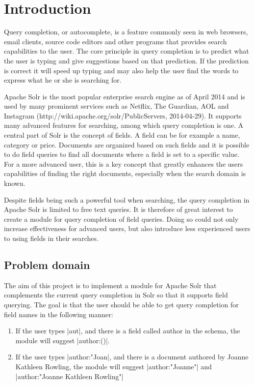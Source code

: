 \section{Introduction}\label{introduction}
Query completion, or autocomplete, is a feature commonly seen in web browsers, email clients, source code editors and other programs that provides search capabilities to the user. The core principle in query completion is to predict what the user is typing and give suggestions based on that prediction. If the prediction is correct it will speed up typing and may also help the user find the words to express what he or she is searching for. 

Apache Solr is the most popular enterprise search engine as of April 2014\cite{ranking} and is used by many prominent services such as Netflix, The Guardian, AOL and Instagram (http://wiki.apache.org/solr/PublicServers, 2014-04-29). It supports many advanced features for searching, among which query completion is one. A central part of Solr is the concept of fields. A field can be for example a name, category or price. Documents are organized based on such fields and it is possible to do field queries to find all documents where a field is set to a specific value. For a more advanced user, this is a key concept that greatly enhances the users capabilities of finding the right documents, especially when the search domain is known. 

Despite fields being such a powerful tool when searching, the query completion in Apache Solr is limited to free text queries. It is therefore of great interest to create a module for query completion of field queries. Doing so could not only increase effectiveness for advanced users, but also introduce less experienced users to using fields in their searches.

\subsection{Problem domain}

The aim of this project is to implement a module for Apache Solr that complements the current query completion in Solr so that it supports field querying. The goal is that the user should be able to get query completion for field names in the following manner:

\begin{enumerate}
\item If the user types |aut|, and there is a field called author in the schema, the module will suggest |author:()|. 
\item If the user types |author:"Joan|, and there is a document authored by Joanne Kathleen Rowling, the module will suggest |author:"Joanne"| and |author:"Joanne Kathleen Rowling"|
\end{enumerate}


